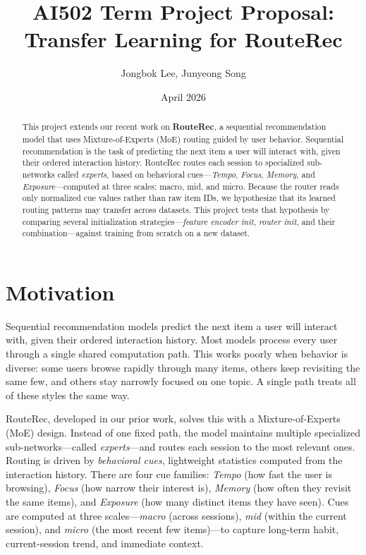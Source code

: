 \documentclass{article}
\title{AI502 Term Project Proposal: Transfer Learning for RouteRec}
\author{Jongbok Lee, Junyeong Song}
\date{April 2026}
\begin{document}
\maketitle
\vspace{-1.0em}

\begin{abstract}
This project extends our recent work on \textbf{RouteRec}, a sequential recommendation model that uses Mixture-of-Experts (MoE) routing guided by user behavior. Sequential recommendation is the task of predicting the next item a user will interact with, given their ordered interaction history. RouteRec routes each session to specialized sub-networks called \emph{experts}, based on behavioral cues---\emph{Tempo}, \emph{Focus}, \emph{Memory}, and \emph{Exposure}---computed at three scales: macro, mid, and micro. Because the router reads only normalized cue values rather than raw item IDs, we hypothesize that its learned routing patterns may transfer across datasets. This project tests that hypothesis by comparing several initialization strategies---\emph{feature encoder init}, \emph{router init}, and their combination---against training from scratch on a new dataset.
\end{abstract}

\section{Motivation}
Sequential recommendation models predict the next item a user will interact with, given their ordered interaction history. Most models process every user through a single shared computation path. This works poorly when behavior is diverse: some users browse rapidly through many items, others keep revisiting the same few, and others stay narrowly focused on one topic. A single path treats all of these styles the same way.

RouteRec, developed in our prior work, solves this with a Mixture-of-Experts (MoE) design. Instead of one fixed path, the model maintains multiple specialized sub-networks---called \emph{experts}---and routes each session to the most relevant ones. Routing is driven by \emph{behavioral cues}, lightweight statistics computed from the interaction history. There are four cue families: \emph{Tempo} (how fast the user is browsing), \emph{Focus} (how narrow their interest is), \emph{Memory} (how often they revisit the same items), and \emph{Exposure} (how many distinct items they have seen). Cues are computed at three scales---\emph{macro} (across sessions), \emph{mid} (within the current session), and \emph{micro} (the most recent few items)---to capture long-term habit, current-session trend, and immediate context.
\end{document}
